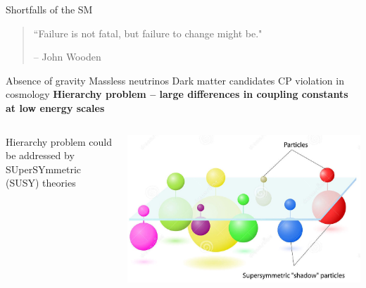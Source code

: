 \documentclass[10pt]{beamer}
\begin{document}
\begin{frame}{Shortfalls of the SM}
\begin{quote}
``Failure is not fatal, but failure to change might be." \par\raggedleft -- \textup{John Wooden}
\end{quote}
\begin{outline}
\1 Absence of gravity 
\1 Massless neutrinos
\1 Dark matter candidates
\1 CP violation in cosmology
\1 {\bf Hierarchy problem -- large differences in coupling constants at low energy scales} 
\end{outline}
\begin{columns}
	\begin{column}{0.5\linewidth}
{\color{blue} Hierarchy problem could be addressed by SUperSYmmetric (SUSY) theories}
	\end{column}
	\begin{column}{0.5\linewidth}
\includegraphics[width=\linewidth]{figures/susyparticles.jpg}
	\end{column}
\end{columns}
\end{frame}
\end{document}
